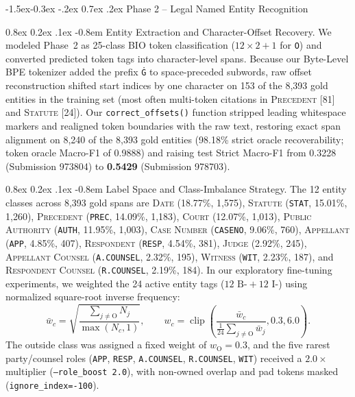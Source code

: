 \documentclass[11pt, oneside]{article}
\makeatletter
\renewcommand\subsection{\@startsection{subsection}{2}{\z@}%
  {-1.5ex\@plus -0.3ex \@minus -.2ex}%
  {0.7ex \@plus .2ex}%
  {\normalfont\large\bfseries}}
\renewcommand\paragraph{\@startsection{paragraph}{4}{\z@}%
  {0.8ex \@plus0.2ex \@minus.1ex}%
  {-0.8em}%
  {\normalfont\normalsize\bfseries}}
\makeatother
\begin{document}
\subsection{Phase 2 -- Legal Named Entity Recognition}

\paragraph{Entity Extraction and Character-Offset Recovery.}
We modeled Phase~2 as 25-class BIO token classification ($12\times 2 + 1$ for \texttt{O}) and converted predicted token tags into character-level spans. Because our Byte-Level BPE tokenizer added the prefix \texttt{Ġ} to space-preceded subwords, raw offset reconstruction shifted start indices by one character on 153 of the 8,393 gold entities in the training set (most often multi-token citations in \textsc{Precedent} [81] and \textsc{Statute} [24]). Our \texttt{correct\_offsets()} function stripped leading whitespace markers and realigned token boundaries with the raw text, restoring exact span alignment on 8,240 of the 8,393 gold entities (98.18\% strict oracle recoverability; token oracle Macro-F1 of 0.9888) and raising test Strict Macro-F1 from 0.3228 (Submission 973804) to \textbf{0.5429} (Submission 978703).

\paragraph{Label Space and Class-Imbalance Strategy.}
The 12 entity classes across 8,393 gold spans are \textsc{Date} (18.77\%, 1,575), \textsc{Statute} (\texttt{STAT}, 15.01\%, 1,260), \textsc{Precedent} (\texttt{PREC}, 14.09\%, 1,183), \textsc{Court} (12.07\%, 1,013), \textsc{Public Authority} (\texttt{AUTH}, 11.95\%, 1,003), \textsc{Case Number} (\texttt{CASENO}, 9.06\%, 760), \textsc{Appellant} (\texttt{APP}, 4.85\%, 407), \textsc{Respondent} (\texttt{RESP}, 4.54\%, 381), \textsc{Judge} (2.92\%, 245), \textsc{Appellant Counsel} (\texttt{A.COUNSEL}, 2.32\%, 195), \textsc{Witness} (\texttt{WIT}, 2.23\%, 187), and \textsc{Respondent Counsel} (\texttt{R.COUNSEL}, 2.19\%, 184). In our exploratory fine-tuning experiments, we weighted the 24 active entity tags ($12\text{ B-} + 12\text{ I-}$) using normalized square-root inverse frequency:
\begin{equation}
\bar{w}_c =
\sqrt{\frac{\sum_{j\neq \text{O}}N_j}{\max(N_c,1)}},
\qquad
w_c =
\operatorname{clip}\left(
\frac{\bar{w}_c}
{\frac{1}{24}\sum_{j\neq \text{O}}\bar{w}_j},
0.3,6.0
\right).
\end{equation}
The outside class was assigned a fixed weight of $w_{\text{O}}=0.3$, and the five rarest party/counsel roles (\texttt{APP}, \texttt{RESP}, \texttt{A.COUNSEL}, \texttt{R.COUNSEL}, \texttt{WIT}) received a $2.0\times$ multiplier (\texttt{--role\_boost 2.0}), with non-owned overlap and pad tokens masked (\texttt{ignore\_index=-100}).
\end{document}

